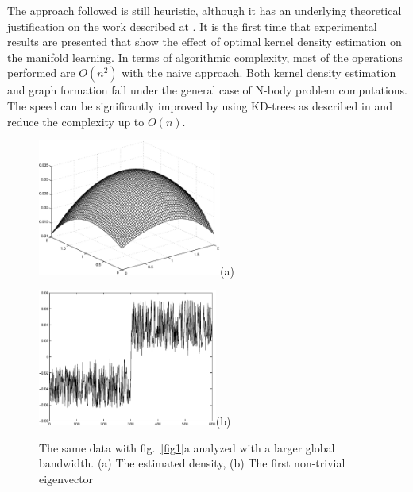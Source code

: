\documentclass[12pt,letterpaper,doublespaced,ETD,dvips,proposal]{gtthesis}
\begin{document}
\begin{Body}
The approach followed is still  heuristic, although it has  an
underlying theoretical justification on the work described at
\cite{jenssen17lpd}. It is the first time that experimental results
are presented that show the effect of optimal kernel density
estimation on the manifold learning.
 In terms of algorithmic
complexity, most of the operations performed are $O(n^2)$ with the
naive approach. Both kernel density estimation and graph formation
fall under the general case of N-body problem computations. The
speed can be significantly improved by using KD-trees as described
in \cite{gray2001nbp} and reduce the complexity up to $O(n)$.

\begin{figure}[h!]
  \centerline{\includegraphics[height=4.5cm]{fig1.1b.eps}(a)}
  \centerline{\includegraphics[height=4.5cm]{fig1.1c.eps}(b)}
  \caption{The same data with fig.~\ref{fig1}a analyzed with a
  larger global bandwidth. (a) The estimated density, (b) The first
  non-trivial eigenvector }
  \label{fig1.1}
\end{figure}






\end{Body}
\end{document}
